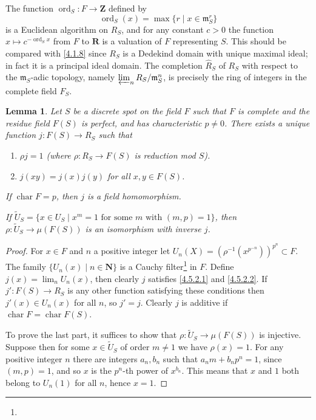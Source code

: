 \documentclass[10pt,leqno]{article}
\newtheorem{lemm}[theo]{Lemma}
\theoremstyle{definition}
\def\NN{\mathbf{N}}
\def\ZZ{\mathbf{Z}}
\def\RR{\mathbf{R}}
\def\mm{\mathfrak{m}}
\DeclareMathOperator{\chr}{char}
\DeclareMathOperator{\ord}{ord}
\def\fnfosi{}
\begin{document}
The function $\ord_S : F \to \ZZ$ defined by
\begin{equation}
\label{4.5.1}
\ord_S(x) = \max \{ r \mid x \in \mm_S^r \}
\end{equation}
is a Euclidean algorithm on $R_S$, and for any constant $c > 0$ the function $x \mapsto c^{-\ord_S x}$ from $F$ to $\RR$ is a valuation of $F$ representing $S$.
This should be compared with \ref{4.1.8} since $R_S$ is a Dedekind domain with unique maximal ideal; in fact it is a principal ideal domain.
The completion $\widehat R_S$ of $R_S$ with respect to the $\mm_S$-adic topology, namely $\varprojlim_{n} R_S / \mm_S^n$, is precisely the ring of integers in the complete field $F_S$.


\begin{lemm}
\label{4.5.2}
Let $S$ be a discrete spot on the field $F$ such that $F$ is complete and the residue field $F(S)$ is perfect, and has characteristic $p \not= 0$.
There exists a unique function $j : F(S) \to R_S$ such that
\begin{enumerate}
\item
\label{4.5.2.1}
$\rho j = 1$ (where $\rho : R_S \to F(S)$ is reduction mod $S$).

\item
\label{4.5.2.2}
$j(xy) = j(x) j(y)$ for all $x,y \in F(S)$.
\end{enumerate}
If $\chr F = p$, then $j$ is a field homomorphism.

If $\widetilde U_S = \{x \in U_S \mid \text{$x^m = 1$ for some $m$ with $(m,p) = 1$} \}$, then $\rho : \widetilde U_S \to \mu(F(S))$ is an isomorphism with inverse $j$.
\end{lemm}

\begin{proof}
For $x \in F$ and $n$ a positive integer let $U_n(X) = (\rho^{-1}(x^{p^{-n}}))^{p^n} \subset F$.
The family $\{U_n(x) \mid n \in \NN\}$ is a Cauchy filter\footnote{\fnfosi} in $F$.
Define $j(x) = \lim_n U_n(x)$, then clearly $j$ satisfies \eqref{4.5.2.1} and \eqref{4.5.2.2}.
If $j' : F(S) \to R_S$ is any other function satisfying these conditions then $j'(x) \in U_n(x)$ for all $n$, so $j' = j$.
Clearly $j$ is additive if $\chr F = \chr F(S)$.

To prove the last part, it suffices to show that $\rho : \widetilde U_S \to \mu(F(S))$ is injective.
Suppose then for some $x \in \widetilde U_S$ of order $m \not= 1$ we have $\rho(x) = 1$.
For any positive integer $n$ there are integers $a_n, b_n$ such that $a_n m + b_n p^n = 1$, since $(m,p) = 1$, and so $x$ is the $p^n$-th power of $x^{b_n}$.
This means that $x$ and $1$ both belong to $U_n(1)$ for all $n$, hence $x = 1$.
\end{proof}
\end{document}
